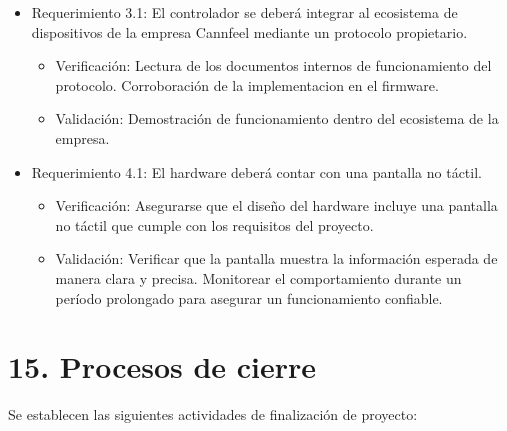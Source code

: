 \documentclass[
11pt, %
codirector, %
]{charter}
\begin{document}
\begin{itemize}
\item Requerimiento 3.1: El controlador se deberá integrar al ecosistema de dispositivos de la empresa Cannfeel mediante un protocolo propietario.

\begin{itemize}
	\item Verificación: Lectura de los documentos internos de funcionamiento del protocolo. Corroboración de la implementacion en el firmware.
	\item Validación: Demostración de funcionamiento dentro del ecosistema de la empresa.
\end{itemize}

\item Requerimiento 4.1: El hardware deberá contar con una pantalla no táctil.

\begin{itemize}
	\item Verificación: Asegurarse que el diseño del hardware incluye una pantalla no táctil que cumple con los requisitos del proyecto.
	\item Validación: Verificar que la pantalla muestra la información esperada de manera clara y precisa. Monitorear el comportamiento durante un período prolongado para asegurar un funcionamiento confiable.
\end{itemize}

\end{itemize}

\section{15. Procesos de cierre}    
\label{sec:cierre}

Se establecen las siguientes actividades de finalización de proyecto:
\end{document}
